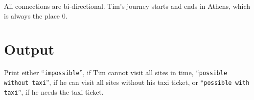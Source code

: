 All connections are bi-directional.
Tim's journey starts and ends in Athens, which is always the place $0$.


\section*{Output}
Print either ``{\tt impossible}'', if Tim cannot visit all sites in time, ``{\tt possible without taxi}'', if he can visit all sites without his taxi ticket, or  ``{\tt possible with taxi}'', if he needs the taxi ticket.

